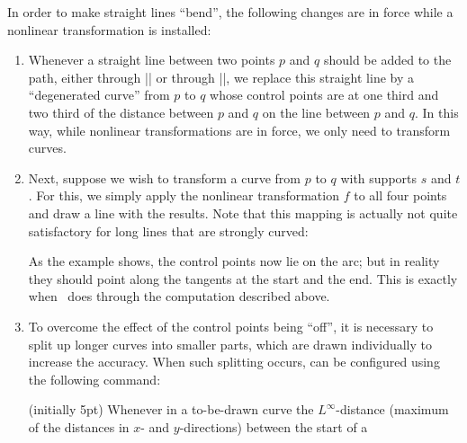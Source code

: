In order to make straight lines ``bend'', the following changes are in force
while a nonlinear transformation is installed:
%
\begin{enumerate}
    \item Whenever a straight line between two points $p$ and $q$ should be
        added to the path, either through |\pgfpathlineto| or through
        |\pgfpathclose|, we replace this straight line by a ``degenerated
        curve'' from $p$ to $q$ whose control points are at one third and two
        third of the distance between $p$ and $q$ on the line between $p$ and
        $q$. In this way, while nonlinear transformations are in force, we only
        need to transform curves.
    \item Next, suppose we wish to transform a curve from $p$ to $q$ with
        supports $s$ and $t$. For this, we simply apply the nonlinear
        transformation $f$ to all four points and draw a line with the results.
        Note that this mapping is actually not quite satisfactory for long
        lines that are strongly curved:
\begin{codeexample}[preamble={\usepgfmodule{nonlineartransformations}}]
\end{codeexample}
        As the example shows, the control points now lie on the arc; but in
        reality they should point along the tangents at the start and the end.
        This is exactly when \pgfname\ does through the computation described
        above.
    \item To overcome the effect of the control points being ``off'', it is
        necessary to split up longer curves into smaller parts, which are drawn
        individually to increase the accuracy. When such splitting occurs, can
        be configured using the following command:
        \begin{command}{\pgfsettransformnonlinearflatness{} (initially 5pt)}
            Whenever in a to-be-drawn curve the $L^\infty$-distance (maximum of
            the distances in $x$- and $y$-directions) between the start of a

\end{command}
\end{enumerate}
